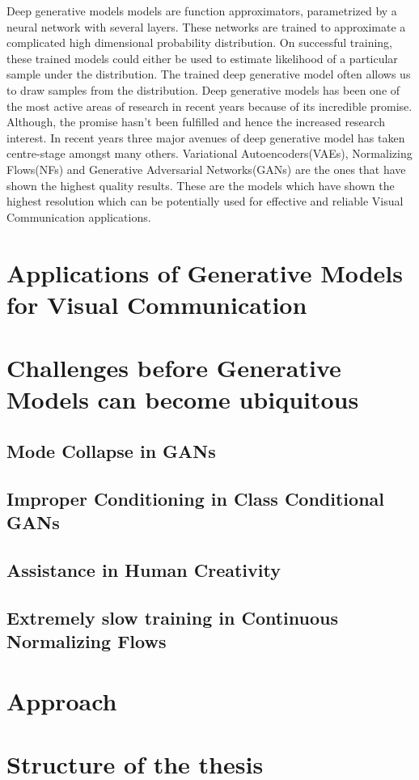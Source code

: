 Deep generative models models are function approximators, parametrized by a neural network with several layers. These networks are trained to approximate a complicated high dimensional probability distribution. On successful training, these trained models could either be used to estimate likelihood of a particular sample under the distribution. The trained deep generative model often allows us to draw samples from the distribution. Deep generative models has been one of the most active areas of research in recent years because of its incredible promise. Although, the promise hasn't been fulfilled and hence the increased research interest. In recent years three major avenues of deep generative model has taken centre-stage amongst many others. Variational Autoencoders(VAEs), Normalizing Flows(NFs) and Generative Adversarial Networks(GANs) are the ones that have shown the highest quality results. These are the models which have shown the highest resolution which can be potentially used for effective and reliable Visual Communication applications. 
 

\section{Applications of Generative Models for Visual Communication}



\section{Challenges before Generative Models can become ubiquitous} 


\subsection{ Mode Collapse in GANs}

\subsection{ Improper Conditioning in Class Conditional GANs}

\subsection{ Assistance in Human Creativity}

\subsection{ Extremely slow training in Continuous Normalizing Flows}

\section{Approach}

\section{Structure of the thesis}
